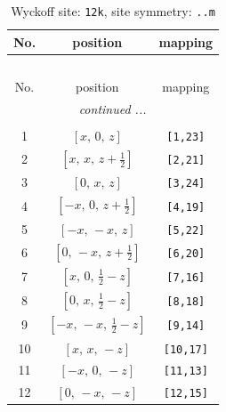 \documentclass[fleqn,8pt]{jsarticle}
\begin{document}
\begin{longtable}{ccc}
\caption{Wyckoff site: {\tt 12k}, site symmetry: {\tt ..m}}
 \\
 \hline \hline
No. & position & mapping \\ \hline \endfirsthead

\multicolumn{2}{l}{\tablename\ \thetable{}} \\
 \hline \hline
No. & position & mapping \\ \hline \endhead

 \hline \hline
\multicolumn{2}{r}{\footnotesize\it continued ...} \\ \endfoot

 \hline \hline
\multicolumn{2}{r}{} \\ \endlastfoot

1 & $\left[ x,\, 0,\, z \right]$ & {\tt [1,23]} \\ \hline
2 & $\left[ x,\, x,\, z + \frac{1}{2} \right]$ & {\tt [2,21]} \\ \hline
3 & $\left[ 0,\, x,\, z \right]$ & {\tt [3,24]} \\ \hline
4 & $\left[ - x,\, 0,\, z + \frac{1}{2} \right]$ & {\tt [4,19]} \\ \hline
5 & $\left[ - x,\, - x,\, z \right]$ & {\tt [5,22]} \\ \hline
6 & $\left[ 0,\, - x,\, z + \frac{1}{2} \right]$ & {\tt [6,20]} \\ \hline
7 & $\left[ x,\, 0,\, \frac{1}{2} - z \right]$ & {\tt [7,16]} \\ \hline
8 & $\left[ 0,\, x,\, \frac{1}{2} - z \right]$ & {\tt [8,18]} \\ \hline
9 & $\left[ - x,\, - x,\, \frac{1}{2} - z \right]$ & {\tt [9,14]} \\ \hline
10 & $\left[ x,\, x,\, - z \right]$ & {\tt [10,17]} \\ \hline
11 & $\left[ - x,\, 0,\, - z \right]$ & {\tt [11,13]} \\ \hline
12 & $\left[ 0,\, - x,\, - z \right]$ & {\tt [12,15]} \\
\end{longtable}
\renewcommand{\arraystretch}{1.2}
\end{document}
